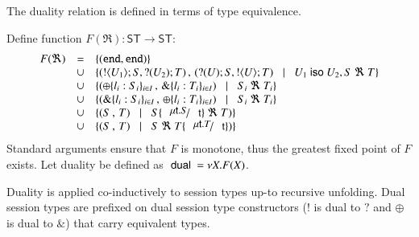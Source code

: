 The duality relation is defined in terms of type equivalence.
%
\begin{definition}[Duality]\rm
\label{def:type_dual}
	Define function $F(\Re): \mathsf{ST} \longrightarrow \mathsf{ST}$:
	\[
		\begin{array}{rcl}
			F(\Re) 	&=&	\set{(\tinact, \tinact)}\\
				&\cup&	\set{(\btout{U_1} S, \btinp{U_2} T)\,,\, (\btinp{U} S, \btout{U} T) \bnfbar U_1 \iso U_2, S\ \Re\ T}\\
				&\cup&	\set{(\btsel{l_i: S_i}_{i \in I} \,,\, \btbra{l_i: T_i}_{i \in I}) \bnfbar  S_i\ \Re\ T_i}\\
				&\cup&	\set{(\btbra{l_i: S_i}_{i \in I}\,,\, \btsel{l_i: T_i}_{i \in I}) \bnfbar S_i\ \Re\ T_i}\\
				&\cup&	\set{(S\,,\, T) \bnfbar S\subst{\trec{t}{S}}{\vart{t}}\ \Re\ T)}\\
				&\cup&	\set{(S\,,\, T) \bnfbar S\ \Re\ T\subst{\trec{t}{T}}{\vart{t}})}
		\end{array}
	\]	
	\noi Standard arguments ensure that $F$ is monotone, thus the greatest fixed point
	of $F$ exists. Let duality be defined as $\ \mathsf{dual}\  = \nu X. F(X)$.
\end{definition}
%
Duality is applied co-inductively to session types
up-to recursive unfolding.
Dual session types are prefixed
on dual session type constructors
($!$ is dual to $?$ and $\oplus$ is dual to $\&$)
that carry equivalent types.


